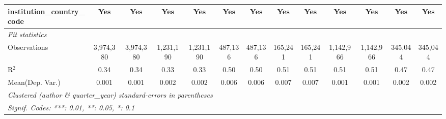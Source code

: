 \begin{tabular}{lcccccccccccc}
   institution\_country\_code               & Yes            & Yes             & Yes           & Yes            & Yes           & Yes             & Yes           & Yes            & Yes            & Yes        & Yes          & Yes\\  
   \midrule
   \emph{Fit statistics}\\
   Observations                             & 3,974,380      & 3,974,380       & 1,231,190     & 1,231,190      & 487,136       & 487,136         & 165,241       & 165,241        & 1,142,966      & 1,142,966  & 345,044      & 345,044\\  
   R$^2$                                    & 0.34           & 0.34            & 0.33          & 0.33           & 0.50          & 0.50            & 0.51          & 0.51           & 0.51           & 0.51       & 0.47         & 0.47\\  
Mean(Dep. Var.) & 0.001 & 0.001 & 0.002 & 0.002 & 0.006 & 0.006 & 0.007 & 0.007 & 0.001 & 0.001 & 0.002 & 0.002 \\
   \midrule \midrule
   \multicolumn{13}{l}{\emph{Clustered (author \& quarter\_year) standard-errors in parentheses}}\\
   \multicolumn{13}{l}{\emph{Signif. Codes: ***: 0.01, **: 0.05, *: 0.1}}\\
\end{tabular}
\par\endgroup

